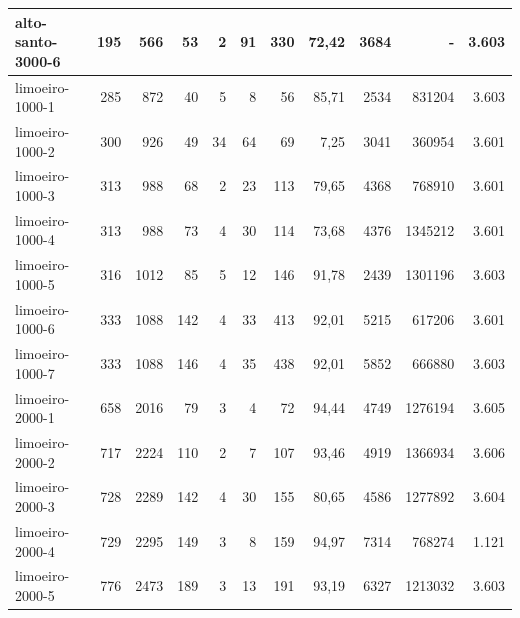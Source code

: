 \begin{table}[ht!]
{\begin{tabular}{lrrrrrrrrrr}
			\rowcolor{rowlight}alto-santo-3000-6                                                   & 195 & 566  & 53  & 2  & 91  & 330 & 72,42 & 3684  & -       & 3.603 \\
			\midrule
			\rowcolor{rowlight}limoeiro-1000-1                                                     & 285 & 872  & 40  & 5  & 8   & 56  & 85,71 & 2534  & 831204  & 3.603 \\
			\rowcolor{rowlight}limoeiro-1000-2                                                     & 300 & 926  & 49  & 34 & 64  & 69  & 7,25  & 3041  & 360954  & 3.601 \\
			\rowcolor{rowlight}limoeiro-1000-3                                                     & 313 & 988  & 68  & 2  & 23  & 113 & 79,65 & 4368  & 768910  & 3.601 \\
			\rowcolor{rowlight}limoeiro-1000-4                                                     & 313 & 988  & 73  & 4  & 30  & 114 & 73,68 & 4376  & 1345212 & 3.601 \\
			\rowcolor{rowlight}limoeiro-1000-5                                                     & 316 & 1012 & 85  & 5  & 12  & 146 & 91,78 & 2439  & 1301196 & 3.603 \\
			\rowcolor{rowlight}limoeiro-1000-6                                                     & 333 & 1088 & 142 & 4  & 33  & 413 & 92,01 & 5215  & 617206  & 3.601 \\
			\rowcolor{rowlight}limoeiro-1000-7                                                     & 333 & 1088 & 146 & 4  & 35  & 438 & 92,01 & 5852  & 666880  & 3.603 \\
			\rowcolor{rowlight}limoeiro-2000-1                                                     & 658 & 2016 & 79  & 3  & 4   & 72  & 94,44 & 4749  & 1276194 & 3.605 \\
			\rowcolor{rowlight}limoeiro-2000-2                                                     & 717 & 2224 & 110 & 2  & 7   & 107 & 93,46 & 4919  & 1366934 & 3.606 \\
			\rowcolor{rowlight}limoeiro-2000-3                                                     & 728 & 2289 & 142 & 4  & 30  & 155 & 80,65 & 4586  & 1277892 & 3.604 \\
			\rowcolor{rowlight}limoeiro-2000-4                                                     & 729 & 2295 & 149 & 3  & 8   & 159 & 94,97 & 7314  & 768274  & 1.121 \\
			\rowcolor{rowlight}limoeiro-2000-5                                                     & 776 & 2473 & 189 & 3  & 13  & 191 & 93,19 & 6327  & 1213032 & 3.603 \\

\end{tabular}}
\end{table}
